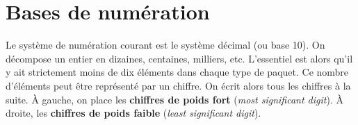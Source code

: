 \def\xxactivite{Cours}

\fichefalse \proftrue \tdfalse \courstrue

\def\xxnumchapitre{Chapitre 1 \vspace{.2cm}}
\def\xxchapitre{\hspace{.12cm} Représentation des nombres en mémoire}

\def\xxcompetences{%
\textsl{%
\textbf{Savoirs et compétences :}\\
\begin{itemize}[label=\ding{112},font=\color{bleuxp}] 
\item Représentation des entiers positifs sur des mots de taille fixe.
\item Représentation des entiers signés sur des mots de taille fixe.
\item Entiers multi-précision de Python.
\item Distinction entre nombres réels, décimaux et flottants.
\item Représentation entre nombres réels, décimaux et flottants.
\item Représentation des flottants sur des mots de taille fixe. Notion de mantisse, d'exposant. 
\item Précision des calculs en flottants.
\end{itemize}
}}

\def\xxfigures{
}%


\setlength{\columnseprule}{.1pt}

\vspace{2cm}
\pagestyle{fancy}
\thispagestyle{plain}


\section{Bases de numération}

Le système de numération courant est le système décimal (ou base 10). 
On décompose un entier en dizaines, centaines, milliers, etc. 
L'essentiel est alors qu'il y ait strictement moins de dix éléments dans chaque type de paquet. Ce nombre d'éléments peut être représenté par un chiffre.
On écrit alors tous les chiffres à la suite. À gauche, on place les \textbf{chiffres de poids fort} (\textit{most significant digit}). À droite, les \textbf{chiffres de poids faible}  (\textit{least significant digit}).

